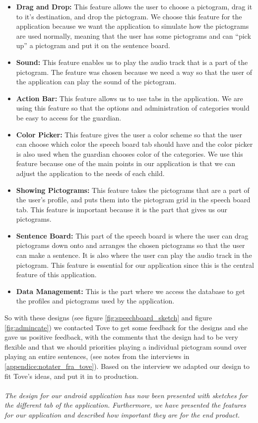 \begin{itemize}
	\item \textbf{Drag and Drop:} This feature allows the user to choose a pictogram, drag it to it's destination, and drop the pictogram.  We choose this feature for the application because we want the application to simulate how the pictograms are used normally, meaning that the user has some pictograms and can ``pick up'' a pictogram and put it on the sentence board.  
	\item \textbf{Sound:} This feature enables us to play the audio track that is a part of the pictogram. The feature was chosen because we need a way so that the user of the application can play the sound of the pictogram. 
	\item \textbf{Action Bar:} This feature allows us to use tabs in the application. We are using this feature so that the options and administration of categories would be easy to access for the guardian. 
	\item \textbf{Color Picker:} This feature gives the user a color scheme so that the user can choose which color the speech board tab should have and the color picker is also used when the guardian chooses color of the categories. We use this feature because one of the main points in our application is that we can adjust the application to the needs of each child. 
	\item \textbf{Showing Pictograms:} This feature takes the pictograms that are a part of the user's profile, and puts them into the pictogram grid in the speech board tab. This feature is important because it is the part that gives us our pictograms. 
	\item \textbf{Sentence Board:} This part of the speech board is where the user can drag pictograms down onto and arranges the chosen pictograms so that the user can make a sentence. It is also where the user can play the audio track in the pictogram. This feature is essential for our application since this is the central feature of this application. 
	\item \textbf{Data Management:} This is the part where we access the database to get the profiles and pictograms used by the application.
\end{itemize}

So with these designs (see figure \ref{fig:speechboard_sketch} and figure \ref{fig:admincate}) we contacted Tove to get some feedback for the designs and she gave us positive  feedback, with the comments that the design had to be very flexible and that we should priorities playing a individual pictogram sound over playing an entire sentences, (see notes from the interviews in \autoref{appendice:notater_fra_tove}). Based on the interview we adapted our design to fit Tove's ideas, and put it in to production.\\  
\\
\textit{The design for our android application has now been presented with sketches for the different tab of the application. Furthermore, we have presented the features for our application and described how important they are for the end product.} 